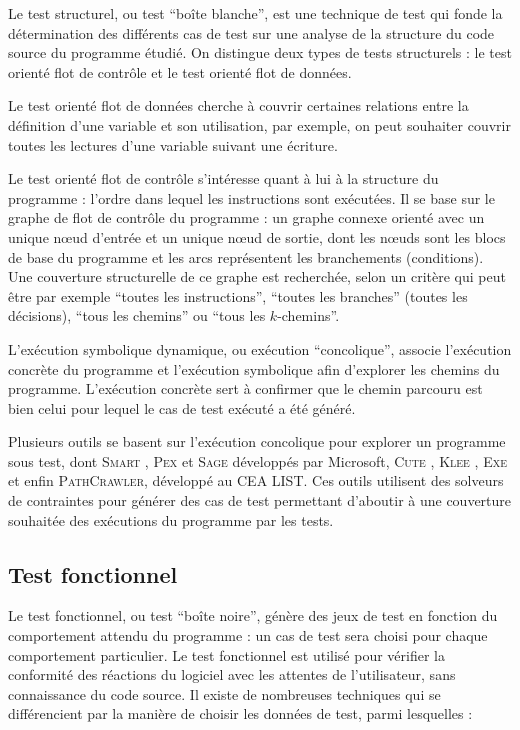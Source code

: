 \documentclass[french]{spimufcphdthesis}
\begin{document}
Le test structurel, ou test ``boîte blanche'', est une technique de test qui
fonde la détermination des différents cas de test sur une analyse de la
structure du code source du programme étudié. On distingue deux types de tests
structurels : le test orienté flot de contrôle et le test orienté flot de
données.

Le test orienté flot de données cherche à couvrir certaines relations entre la
définition d’une variable et son utilisation, par exemple, on peut souhaiter
couvrir toutes les lectures d'une variable suivant une écriture.

Le test orienté flot de contrôle s’intéresse quant à lui à la structure du
programme : l'ordre dans lequel les instructions sont exécutées. Il se base sur
le graphe de flot de contrôle du programme : un graphe connexe orienté avec un
unique n\oe{}ud d’entrée et un unique n\oe{}ud de sortie, dont les n\oe{}uds
sont les blocs de base du programme et les arcs représentent les branchements
(conditions). Une couverture structurelle de ce graphe est recherchée, selon un
critère qui peut être par exemple ``toutes les instructions'',
``toutes les branches'' (toutes les décisions), ``tous les chemins'' ou
``tous les $k$-chemins''.

L’exécution symbolique dynamique, ou exécution ``concolique'', associe
l’exécution concrète du programme et l’exécution symbolique afin d’explorer les
chemins du programme. L’exécution concrète sert à confirmer que le chemin
parcouru est bien celui pour lequel le cas de test exécuté a été généré.

Plusieurs outils se basent sur l'exécution concolique pour explorer un programme
sous test, dont \textsc{Smart} \cite{SMART}, \textsc{Pex} \cite{PEX} et
\textsc{Sage} \cite{SAGE} développés par Microsoft, \textsc{Cute} \cite{CUTE},
\textsc{Klee} \cite{KLEE}, \textsc{Exe} \cite{EXE} et enfin
\textsc{PathCrawler}, \cite{PathCrawler} développé au CEA LIST. Ces outils
utilisent des solveurs de contraintes pour générer des cas de test permettant
d'aboutir à une couverture souhaitée des exécutions du programme par les tests.


\subsection{Test fonctionnel}
\label{sec:test-fonctionnel}

Le test fonctionnel, ou test ``boîte noire'', génère des jeux de test en
fonction du comportement attendu du programme : un cas de test sera choisi pour
chaque comportement particulier. Le test fonctionnel est utilisé pour vérifier
la conformité des réactions du logiciel avec les attentes de l'utilisateur, sans
connaissance du code source. Il existe de nombreuses techniques qui se
différencient par la manière de choisir les données de test, parmi lesquelles :
\end{document}
